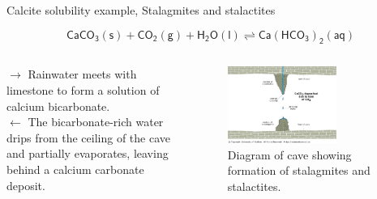 %
%
\begin{frame}{Calcite solubility example,  Stalagmites and stalactites}

\[\mathsf{CaCO_3(s) + CO_2(g) + H_2O(l) \rightleftharpoons Ca(HCO_3)_2(aq)}\]

\vskip -10pt
\begin{columns}[t]
\vskip 10pt
$\rightarrow$ Rainwater meets with limestone to form a solution of calcium bicarbonate. \\[5pt]
$\leftarrow$ The bicarbonate-rich water drips from the ceiling of the cave and partially evaporates, leaving behind a calcium carbonate deposit.


\begin{figure}\centering
\includegraphics[width=0.7\textwidth]{figures/chemical-equilibrium/stalagmites-stalactities.jpg}
\caption{\footnotesize
Diagram of cave showing formation of stalagmites and stalactites.}
\end{figure}

\end{columns}

\end{frame}
%
%
